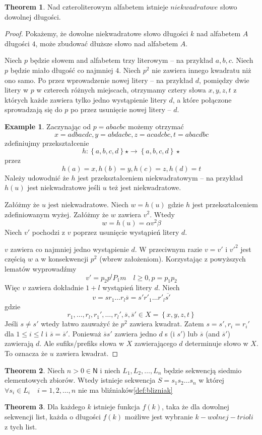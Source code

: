 \documentclass[11pt,a4paper]{article}
\theoremstyle{definition}
\newtheorem{theorem}{Theorem}[section]
\newtheorem{example}{Example}[section]
\begin{document}
\begin{theorem}
Nad czteroliterowym alfabetem istnieje $niekwadratowe$
słowo dowolnej długości.
\begin{proof}
Pokażemy, że dowolne niekwadratowe słowo długości $k$ nad alfabetem $A$
długości $4$, może zbudować dłuższe słowo nad alfabetem $A$.

Niech $p$ będzie słowem and alfabetem trzy literowym -- na przykład $a,b,c$.
Niech $p$ będzie miało długość co najmniej $4$.
Niech $p^2$ nie zawiera innego kwadratu niż ono samo.
Po przez wprowadzenie nowej litery -- na przykład $d$, pomiędzy
dwie litery w $p$ w czterech różnych miejscach, otrzymamy cztery
słowa $x,y,z,t$ z których każde zawiera tylko jedno wystąpienie litery $d$,
a które połączone sprowadzają się do $p$ po przez usunięcie nowej litery -- $d$.

\begin{example}
Zaczynając od $p = abacbc$ możemy otrzymać
$$
x = adbacdc, y = abdacbc, z = acadcbc, t = abacdbc
$$
zdefiniujmy przekształcenie 
$$
h: \left\lbrace a,b,c,d\right\rbrace\star \rightarrow \left\lbrace a,b,c,d\right\rbrace\star 
$$
przez
$$
h(a) = x, h(b) = y, h(c) = z, h(d) = t
$$
Należy udowodnić że $h$ jest przekształceniem niekwadratowym -- na przykład
$h(u)$ jest niekwadratowe jeśli $u$ też jest niekwadratowe.
\end{example}
Załóżmy że $u$ jest niekwadratowe. Niech $w=h(u)$ gdzie $h$ jest przekształceniem
zdefiniowanym wyżej. Załóżmy że $w$ zawiera $v^2$. Wtedy
$$
w = h(u) = \alpha v^2\beta
$$
Niech $v'$ pochodzi z $v$ poprzez usunięcie wystąpień litery $d$.

$v$ zawiera co najmniej jedno wystąpienie $d$. W przeciwnym razie $v = v'$ i
$v'^2$ jest częścią $w$ a w konsekwencji $p^2$ (wbrew założeniom). Korzystając z 
powyższych lematów wyprowadźmy
$$
v' = p_2 p^l P_1 m \quad l \geq 0, p = p_1 p_2
$$
Więc $v$ zawiera dokładnie $1+l$ wystąpień litery $d$. Niech
$$
v = sr_1\dots r_l\overline{s} = s'r'_1\dots r'_l\overline{s'}
$$
gdzie 
$$
r_1,\ldots,r_l,r_1',\ldots,r_l',\overline{s},\overline{s}' 
\in X = \left\lbrace x,y,z,t \right\rbrace
$$
Jeśli $s \neq s'$ wtedy łatwo zauważyć że $p^2$ zawiera kwadrat.
Zatem $s=s', r_i=r_i'$ dla $1 \leqslant i \leqslant l$ i 
$\overline{s} = \overline{s}'$. Ponieważ $\overline{s}s'$ zawiera
jedno $d$ s (i $s'$) lub $\overline{s}$ (and $\overline{s}'$) 
zawierają $d$. Ale sufiks/prefiks słowa w $X$ zawierającego $d$
determinuje słowo w $X$. To oznacza że $u$ zawiera kwadrat.
\end{proof}
\end{theorem}

\begin{theorem}
Niech $n > 0 \in \mathsf{N}$ i 
niech $L_1,L_2,\ldots,L_n$ będzie sekwencją 
siedmio elementowych zbiorów. Wtedy istnieje sekwencja $S=s_1s_2\ldots s_n$ w której
$\forall s_i \in L_i \quad i = 1,2,\ldots,n$ nie ma bliźniaków\ref{def:blizniak}
\end{theorem}

\begin{theorem}
Dla każdego $k$ istnieje funkcja $f(k)$, taka że
dla dowolnej sekwencji list, każda o długości $f(k)$
możliwe jest wybranie $k-wolnej-trioli$ z tych list.

\end{theorem}
\end{document}
